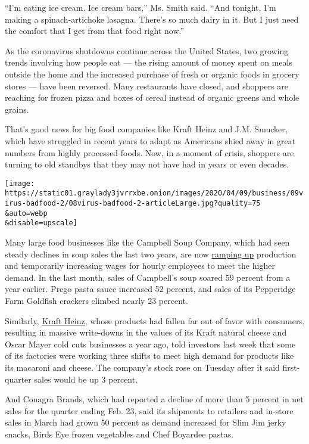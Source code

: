 ``I'm eating ice cream. Ice cream bars,'' Ms. Smith said. ``And tonight,
I'm making a spinach-artichoke lasagna. There's so much dairy in it. But
I just need the comfort that I get from that food right now.''

As the coronavirus shutdowns continue across the United States, two
growing trends involving how people eat --- the rising amount of money
spent on meals outside the home and the increased purchase of fresh or
organic foods in grocery stores --- have been reversed. Many restaurants
have closed, and shoppers are reaching for frozen pizza and boxes of
cereal instead of organic greens and whole grains.

That's good news for big food companies like Kraft Heinz and J.M.
Smucker, which have struggled in recent years to adapt as Americans
shied away in great numbers from highly processed foods. Now, in a
moment of crisis, shoppers are turning to old standbys that they may not
have had in years or even decades.

\texttt{[image: https://static01.graylady3jvrrxbe.onion/images/2020/04/09/business/09virus-badfood-2/08virus-badfood-2-articleLarge.jpg?quality=75\\\&auto=webp\\\&disable=upscale]}

Many large food businesses like the Campbell Soup Company, which had
seen steady declines in soup sales the last two years, are now
\href{https://www.nasdaq.com/articles/coronavirus-campbell-soup-ramping-up-production-2020-03-05}{ramping
up} production and temporarily increasing wages for hourly employees to
meet the higher demand. In the last month, sales of Campbell's soup
soared 59 percent from a year earlier. Prego pasta sauce increased 52
percent, and sales of its Pepperidge Farm Goldfish crackers climbed
nearly 23 percent.

Similarly,
\href{https://www.nytimes3xbfgragh.onion/2019/02/21/business/kraft-heinz-earnings.html?searchResultPosition=3}{Kraft
Heinz,} whose products had fallen far out of favor with consumers,
resulting in massive write-downs in the values of its Kraft natural
cheese and Oscar Mayer cold cuts businesses a year ago, told investors
last week that some of its factories were working three shifts to meet
high demand for products like its macaroni and cheese. The company's
stock rose on Tuesday after it said first-quarter sales would be up 3
percent.

And Conagra Brands, which had reported a decline of more than 5 percent
in net sales for the quarter ending Feb. 23, said its shipments to
retailers and in-store sales in March had grown 50 percent as demand
increased for Slim Jim jerky snacks, Birds Eye frozen vegetables and
Chef Boyardee pastas.

